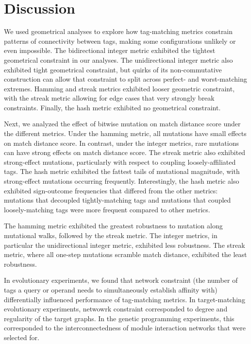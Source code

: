 \section{Discussion}


% 
We used geometrical analyses to explore how tag-matching metrics constrain patterns of connectivity between tags, making some configurations unlikely or even impossible.
The bidirectional integer metric exhibited the tightest geometrical constraint in our analyses.
The unidirectional integer metric also exhibited tight geometrical constraint, but quirks of its non-commutative construction can allow that constraint to split across perfect- and worst-matching extremes.
Hamming and streak metrics exhibited looser geometric constraint, with the streak metric allowing for edge cases that very strongly break constraints.
Finally, the hash metric exhibited no geometrical constraint.

Next, we analyzed the effect of bitwise mutation on match distance score under the different metrics.
Under the hamming metric, all mutations have small effects on match distance score.
In contrast, under the integer metrics, rare mutations can have strong effects on match distance score.
The streak metric also exhibited strong-effect mutations, particularly with respect to coupling loosely-affiliated tags.
The hash metric exhibited the fattest tails of mutational magnitude, with strong-effect mutations occurring frequently.
Interestingly, the hash metric also exhibited sign-outcome frequencies that differed from the other metrics: mutations that decoupled tightly-matching tags and mutations that coupled loosely-matching tags were more frequent compared to other metrics.

The hamming metric exhibited the greatest robustness to mutation along mutational walks, followed by the streak metric.
The integer metrics, in particular the unidirectional integer metric, exhibited less robustness.
The streak metric, where all one-step mutations scramble match distance, exhibited the least robustness.

In evolutionary experiments, we found that network constraint (the number of tags a query or operand needs to simultaneously establish affinity with) differentially influenced performance of tag-matching metrics. 
In target-matching evolutionary experiments, netwowrk constraint corresponded to degree and regularity of the target graphs.
In the genetic programming experiments, this corresponded to the interconnectedness of module interaction networks that were selected for.

